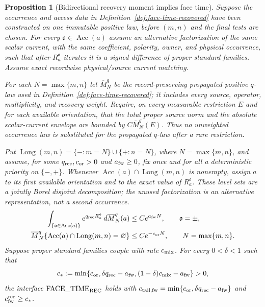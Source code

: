 \documentclass[11pt]{article}
\newtheorem{proposition}[theorem]{Proposition}
\begin{document}
\begin{proposition}[Bidirectional recovery moment implies face time]
\label{prop:bidirectional-recovery-implies-face-time}
Suppose the occurrence and access data in
Definition~\ref{def:face-time-recovered} have been constructed on one
immutable positive law, before $(m,n)$ and the final tests are chosen.
For every $\mathfrak o\in\operatorname{Acc}(a)$ assume an alternative
factorization of the same scalar current, with the same coefficient,
polarity, owner, and physical occurrence, such that after
$R_a^{\mathfrak o}$ iterates it is a signed difference of proper standard
families.  Assume exact recordwise physical/source current matching.

For each $N=\max\{m,n\}$ let
$\overline M_N^q$ be the record-preserving propagated positive $q$-law
used in Definition~\ref{def:face-time-recovered}; it includes every source,
operator, multiplicity, and recovery weight.  Require, on every measurable
restriction $E$ and for each available orientation, that the total proper
source norm and the absolute scalar-current envelope are bounded by
$C\overline M_N^q(E)$.  Thus no unweighted occurrence law is substituted
for the propagated $q$-law after a rare restriction.

Put
$\operatorname{Long}(m,n)=
\{-:m=N\}\cup\{+:n=N\}$, where $N=\max\{m,n\}$, and assume, for some
$q_{\rm rec},c_{\rm or}>0$ and $a_{\rm fw}\ge0$,
fix once and for all a deterministic priority on $\{-,+\}$.  Whenever
$\operatorname{Acc}(a)\cap\operatorname{Long}(m,n)$ is nonempty, assign
$a$ to its first available orientation and to the exact value of
$R_a^{\mathfrak o}$.  These level sets are a jointly Borel disjoint
decomposition; the unused factorization is an alternative representation,
not a second occurrence.
\begin{align}
 \int_{\{\mathfrak o\in\operatorname{Acc}(a)\}}
 e^{q_{\rm rec}R_a^{\mathfrak o}}\,
 d\overline M_N^q(a)&\le Ce^{a_{\rm fw}N},
 \qquad \mathfrak o=\pm,
\label{eq:bidirectional-recovery-exponential-moment}\\
 \overline M_N^q\{
 \operatorname{Acc}(a)\cap\operatorname{Long}(m,n)=\varnothing\}
 &\le Ce^{-c_{\rm or}N},
 \qquad N=\max\{m,n\}.
\label{eq:bidirectional-orientation-tail}
\end{align}
Suppose proper standard families couple with rate $c_{\rm mix}$.  For every
$0<\delta<1$ such that
\begin{equation}
\label{eq:bidirectional-face-time-rate}
 c_*:=\min\{c_{\rm or},\delta q_{\rm rec}-a_{\rm fw},
       (1-\delta)c_{\rm mix}-a_{\rm fw}\}>0,
\end{equation}
the interface $\mathrm{FACE\_TIME}_{\rm REC}$ holds with
$c_{\rm tail,fw}=\min\{c_{\rm or},
\delta q_{\rm rec}-a_{\rm fw}\}$ and
$c_{\rm fw}^{\rm rec}\ge c_*$.
\end{proposition}
\end{document}
